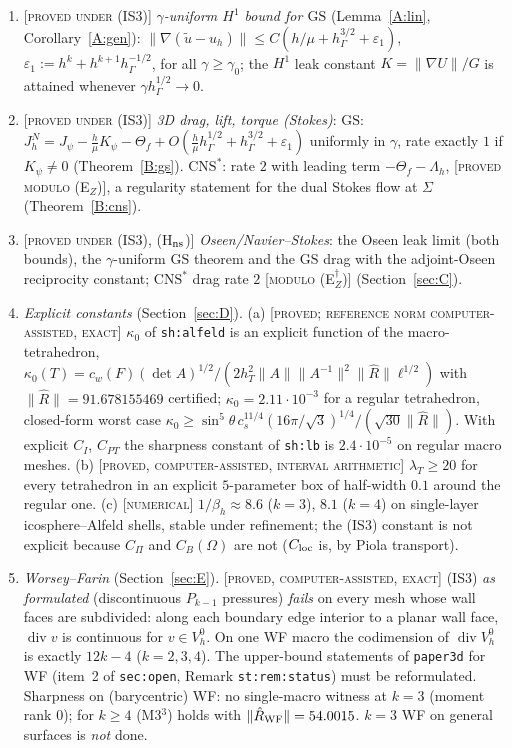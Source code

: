 \documentclass[11pt,reqno]{amsart}
\theoremstyle{plain}
\theoremstyle{definition}
\newcommand{\status}[1]{\textup{\textsc{[#1]}}}
\newcommand{\hG}{h_\Gamma}
\newcommand{\VO}{V_h^0}
\newcommand{\ut}{\tilde u}
\newcommand{\norm}[1]{\lVert #1\rVert}
\newcommand{\GS}{\mathrm{GS}}
\newcommand{\CNS}{\mathrm{CNS}^\ast}
\renewcommand{\div}{\operatorname{div}}
\begin{document}
\begin{enumerate}[label=(\alph*)]
\item \status{proved under (IS3)} \emph{$\gamma$-uniform $H^1$ bound for $\GS$} (Lemma~\ref{A:lin}, Corollary~\ref{A:gen}): $\norm{\nabla(\ut-u_h)}\le C(h/\mu+\hG^{3/2}+\varepsilon_1)$, $\varepsilon_1:=h^k+h^{k+1}\hG^{-1/2}$, for all $\gamma\ge\gamma_0$; the $H^1$ leak constant $K=\norm{\nabla U}/G$ is attained whenever $\gamma\hG^{1/2}\to0$.
\item \status{proved under (IS3)} \emph{3D drag, lift, torque (Stokes)}: $\GS$: $J^N_h=J_\psi-\frac h\mu K_\psi-\Theta_f+O(\frac h\mu\hG^{1/2}+\hG^{3/2}+\varepsilon_1)$ uniformly in $\gamma$, rate exactly $1$ if $K_\psi\ne0$ (Theorem~\ref{B:gs}). $\CNS$: rate $2$ with leading term $-\Theta_f-\Lambda_h$, \status{proved modulo (E$_Z$)}, a regularity statement for the dual Stokes flow at $\Sigma$ (Theorem~\ref{B:cns}).
\item \status{proved under (IS3), (H$_{\rm ns}$)} \emph{Oseen/Navier--Stokes}: the Oseen leak limit (both bounds), the $\gamma$-uniform $\GS$ theorem and the $\GS$ drag with the adjoint-Oseen reciprocity constant; $\CNS$ drag rate $2$ \status{modulo (E$_Z^\dagger$)} (Section~\ref{sec:C}).
\item \emph{Explicit constants} (Section~\ref{sec:D}). (a) \status{proved; reference norm computer-assisted, exact} $\kappa_0$ of \texttt{sh:alfeld} is an explicit function of the macro-tetrahedron, $\kappa_0(T)=c_w(F)(\det A)^{1/2}/(2h_T^2\norm A\norm{A^{-1}}^2\norm{\hat R}\ell^{1/2})$ with $\norm{\hat R}=91.678155469$ certified; $\kappa_0=2.11\cdot10^{-3}$ for a regular tetrahedron, closed-form worst case $\kappa_0\ge\sin^5\theta\,c_s^{11/4}(16\pi/\sqrt3)^{1/4}/(\sqrt{30}\norm{\hat R})$. With explicit $C_I$, $C_{PT}$ the sharpness constant of \texttt{sh:lb} is $2.4\cdot10^{-5}$ on regular macro meshes. (b) \status{proved, computer-assisted, interval arithmetic} $\lambda_T\ge20$ for every tetrahedron in an explicit $5$-parameter box of half-width $0.1$ around the regular one. (c) \status{numerical} $1/\beta_h\approx8.6$ ($k=3$), $8.1$ ($k=4$) on single-layer icosphere--Alfeld shells, stable under refinement; the (IS3) constant is not explicit because $C_\Pi$ and $C_B(\Omega)$ are not ($C_{\rm loc}$ is, by Piola transport).
\item \emph{Worsey--Farin} (Section~\ref{sec:E}). \status{proved, computer-assisted, exact} (IS3) \emph{as formulated} (discontinuous $P_{k-1}$ pressures) \emph{fails} on every mesh whose wall faces are subdivided: along each boundary edge interior to a planar wall face, $\div v$ is continuous for $v\in\VO$. On one WF macro the codimension of $\div\VO$ is exactly $12k-4$ ($k=2,3,4$). The upper-bound statements of \texttt{paper3d} for WF (item~2 of \texttt{sec:open}, Remark \texttt{st:rem:status}) must be reformulated. Sharpness on (barycentric) WF: no single-macro witness at $k=3$ (moment rank $0$); for $k\ge4$ (M3$^3$) holds with $\norm{\hat R_{\rm WF}}=54.0015$. $k=3$ WF on general surfaces is \emph{not} done.
\end{enumerate}
\end{document}
